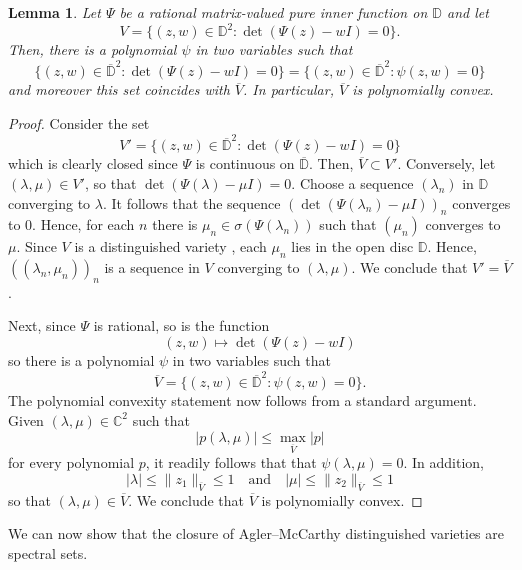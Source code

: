 \documentclass[10pt]{amsart}
\newcommand{\bC}{{\mathbb{C}}}
\newcommand{\bD}{{\mathbb{D}}}
\newcommand{\ol}{\overline}
\newcommand{\qand}{\quad\text{and}\quad}
\newtheorem{lemma}{Lemma}[section]
\theoremstyle{definition}
\begin{document}
\begin{lemma}\label{L:polyconv}
Let $\Psi$ be a rational matrix-valued pure inner function on $\bD$ and let
\[
V=\{(z,w)\in \bD^2:\det(\Psi(z)-wI)=0\}.
\]
Then, there is a polynomial $\psi$ in two variables such that
\[
\{(z,w)\in \ol{\bD}^2:\det(\Psi(z)-wI)=0\}=\{(z,w)\in \ol{\bD}^2:\psi(z,w)=0\}
\]
and moreover this set coincides with $\ol{V}$. In particular, $\ol{V}$ is polynomially convex.
\end{lemma}
\begin{proof}
Consider the  set
\[
V'=\{(z,w)\in \ol{\bD}^2:\det(\Psi(z)-wI)=0\}
\]
which is clearly closed since $\Psi$ is continuous on $\ol{\bD}$. Then,  $\ol{V}\subset V'$. Conversely, let $(\lambda,\mu)\in  V'$,  so that $\det(\Psi(\lambda)-\mu I)=0$. Choose a sequence $(\lambda_n)$ in $\bD$ converging to $\lambda$. It follows that the sequence $(\det(\Psi(\lambda_n)-\mu I))_n$ converges to $0$. Hence, for each $n$ there is   $\mu_n\in \sigma(\Psi(\lambda_{n}))$ such that $(\mu_n)$ converges to $\mu$. Since $V$ is a distinguished variety \cite[Theorem 1.12]{AM2005}, each $\mu_n$ lies in the open disc $\bD$. Hence, $((\lambda_n,\mu_n))_n$ is a sequence in $V$ converging to $(\lambda,\mu)$. We conclude that $V'=\ol{V}$.

Next, since $\Psi$ is rational, so is the function
\[
(z,w)\mapsto \det(\Psi(z)-wI)
\]
so there is a polynomial $\psi$ in two variables such that
\[
\ol{V}=\{(z,w)\in \ol{\bD}^2:\psi(z,w)=0\}.
\] 
The polynomial convexity statement now follows from a standard argument. 
Given $(\lambda,\mu)\in \bC^2$ such that 
\[
|p(\lambda,\mu)|\leq \max_{\ol{V}} |p|
\]
for every polynomial $p$, it readily follows that that $\psi(\lambda,\mu)=0$. In addition,
\[
|\lambda|\leq \|z_1\|_{\ol{V}}\leq 1  \qand |\mu|\leq \|z_2\|_{\ol{V}}\leq 1
\]
so that $(\lambda,\mu)\in \ol{V} $. We conclude that $\ol{V}$ is polynomially convex. 
\end{proof}

We can now show that the closure of Agler--McCarthy distinguished varieties are spectral sets.
\end{document}
